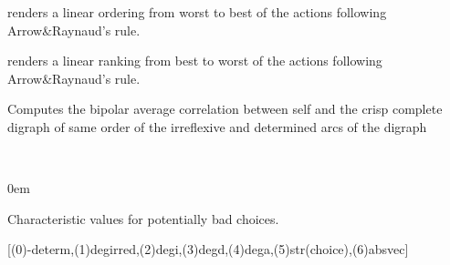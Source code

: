 \documentclass[letterpaper,10pt,english]{sphinxmanual}
\begin{document}
\begin{fulllineitems}
\begin{fulllineitems}
\end{fulllineitems}


\begin{fulllineitems}
\label{techDoc:digraphs.Digraph.computeArrowRaynaudOrder}
renders a linear ordering from worst to best of the actions following Arrow\&Raynaud's rule.

\end{fulllineitems}


\begin{fulllineitems}
\label{techDoc:digraphs.Digraph.computeArrowRaynaudRanking}
renders a linear ranking from best to worst of the actions following Arrow\&Raynaud's rule.

\end{fulllineitems}


\begin{fulllineitems}
\label{techDoc:digraphs.Digraph.computeAverageValuation}
Computes the bipolar average correlation between
self and the crisp complete digraph of same order
of the irreflexive and determined arcs of the digraph

\end{fulllineitems}


\begin{fulllineitems}
\label{techDoc:digraphs.Digraph.computeBadChoices}~
\begin{DUlineblock}{0em}
\item[] Characteristic values for potentially bad choices.
\item[] {[}(0)-determ,(1)degirred,(2)degi,(3)degd,(4)dega,(5)str(choice),(6)absvec{]}
\end{DUlineblock}

\end{fulllineitems}



\end{fulllineitems}
\end{document}
